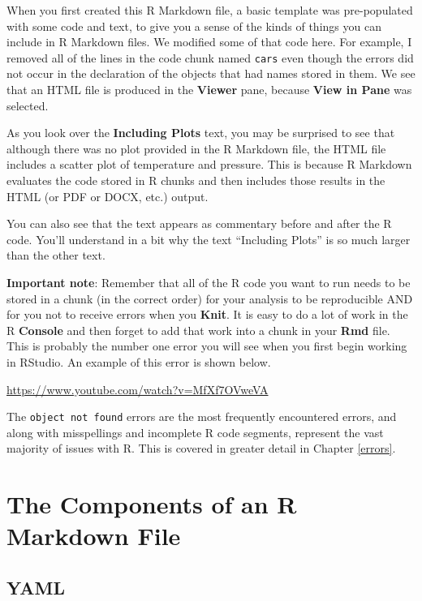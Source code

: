\documentclass[]{tufte-book}
\begin{document}
When you first created this R Markdown file, a basic template was pre-populated with some code and text, to give you a sense of the kinds of things you can include in R Markdown files. We modified some of that code here. For example, I removed all of the lines in the code chunk named \texttt{cars} even though the errors did not occur in the declaration of the objects that had names stored in them. We see that an HTML file is produced in the \textbf{Viewer} pane, because \textbf{View in Pane} was selected.

As you look over the \textbf{Including Plots} text, you may be surprised to see that although there was no plot provided in the R Markdown file, the HTML file includes a scatter plot of temperature and pressure. This is because R Markdown evaluates the code stored in R chunks and then includes those results in the HTML (or PDF or DOCX, etc.) output.

You can also see that the text appears as commentary before and after the R code. You'll understand in a bit why the text ``Including Plots'' is so much larger than the other text.

\textbf{Important note}: Remember that all of the R code you want to run needs to be stored in a chunk (in the correct order) for your analysis to be reproducible AND for you not to receive errors when you \textbf{Knit}. It is easy to do a lot of work in the R \textbf{Console} and then forget to add that work into a chunk in your \textbf{Rmd} file. This is probably the number one error you will see when you first begin working in RStudio. An example of this error is shown below.

\vspace{0.1in}\begin{center}\footnotesize{\url{https://www.youtube.com/watch?v=MfXf7OVweVA}}\end{center}\vspace{0.1in}

The \texttt{object\ not\ found} errors are the most frequently encountered errors, and along with misspellings and incomplete R code segments, represent the vast majority of issues with R. This is covered in greater detail in Chapter \ref{errors}.

\section{The Components of an R Markdown File}\label{the-components-of-an-r-markdown-file}

\subsection{YAML}\label{yaml}
\end{document}
